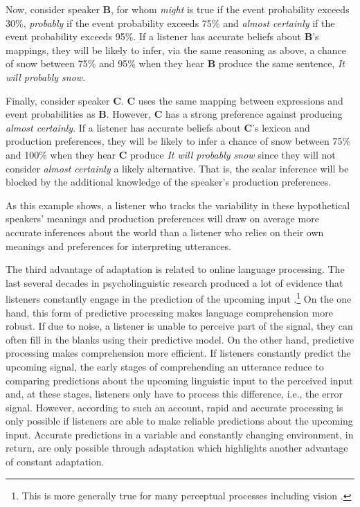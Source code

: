 Now, consider speaker {\bf B}, for whom \textit{might} is true if the event probability exceeds 30\%, 
\textit{probably} if the event probability exceeds 75\% and \textit{almost certainly}  if the event probability exceeds 95\%. If a listener has
accurate beliefs about {\bf B}'s mappings, they will be likely to infer, via the same reasoning as above, a chance of snow between 75\% and 95\% when they hear {\bf B} produce the same sentence, \textit{It will probably snow}.

Finally, consider speaker {\bf C}. {\bf C} uses the same mapping between expressions and event probabilities as {\bf B}. However, {\bf C} has a strong preference against 
producing \textit{almost certainly}. If a listener has accurate beliefs about {\bf C}'s lexicon and production preferences, 
they will be likely to infer a chance of snow between 75\% and 100\% when they hear {\bf C} produce \textit{It will probably snow} since they will not
consider  \textit{almost certainly} a likely alternative. That is, the scalar inference will be blocked by the additional knowledge of the speaker's production preferences. 

As this example shows, a listener who tracks the variability in these hypothetical speakers' meanings and production preferences 
will draw on average more accurate inferences about the world than a listener who relies on their own meanings and preferences
for interpreting utterances.

The third advantage of adaptation is related to online language processing. The last several decades
in psycholinguistic research produced a lot of evidence that listeners constantly engage in the prediction of 
the upcoming input .\footnote{This is more generally true for many perceptual 
processes including vision \parencite[see, e.g.,][]{Clark2013,Friston2010}.} 
On the one hand, this form of predictive processing makes language comprehension more robust. If due to noise,
a listener is unable to perceive part of the signal, they can often fill in the blanks using their predictive model.
On the other hand, predictive processing makes comprehension more efficient. 
If listeners constantly predict the upcoming signal, the early stages of comprehending an utterance 
reduce to comparing predictions about the upcoming linguistic input to the perceived input and, at these stages, 
listeners only have to process this difference, i.e., the error signal. However, according to such an account,
rapid and accurate processing is only possible if listeners are able to make reliable predictions about the upcoming
input. Accurate predictions in a variable and constantly changing environment, in return, are only possible through
 adaptation which highlights another advantage of constant adaptation.

